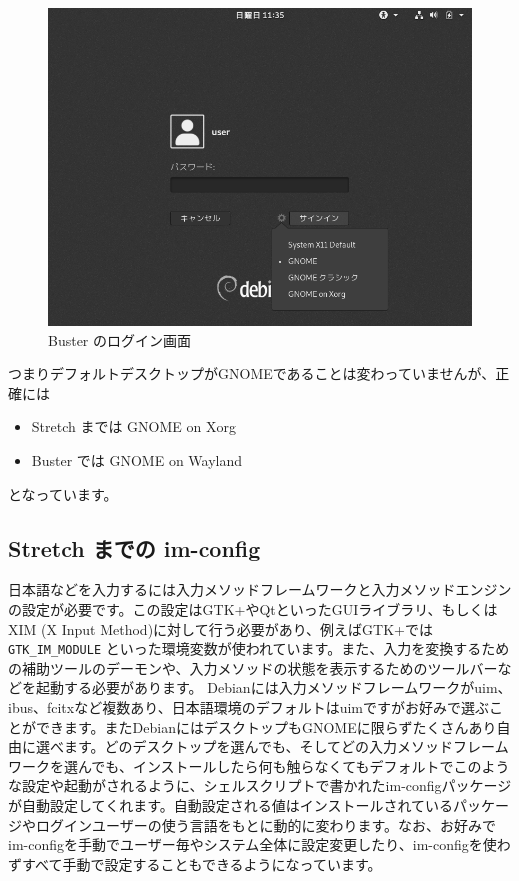 \documentclass[mingoth,a4paper]{jsarticle}
\begin{document}
\begin{figure}[h]
\begin{center}
\includegraphics[keepaspectratio,width=0.7\hsize]{image201907/buster_gnome_0_gray.png}
\end{center}
\caption{Buster のログイン画面}
\label{fig:gdm3-buster}
\end{figure}

つまりデフォルトデスクトップがGNOMEであることは変わっていませんが、正確には

\begin{itemize}
 \item Stretch までは GNOME on Xorg
 \item Buster では GNOME on Wayland
\end{itemize}

となっています。

\subsection{Stretch までの im-config}
日本語などを入力するには入力メソッドフレームワークと入力メソッドエンジンの設定が必要です。この設定はGTK+やQtといったGUIライブラリ、もしくはXIM (X Input Method)に対して行う必要があり、例えばGTK+では\verb|GTK_IM_MODULE| といった環境変数が使われています。また、入力を変換するための補助ツールのデーモンや、入力メソッドの状態を表示するためのツールバーなどを起動する必要があります。
Debianには入力メソッドフレームワークがuim、ibus、fcitxなど複数あり、日本語環境のデフォルトはuimですがお好みで選ぶことができます。またDebianにはデスクトップもGNOMEに限らずたくさんあり自由に選べます。どのデスクトップを選んでも、そしてどの入力メソッドフレームワークを選んでも、インストールしたら何も触らなくてもデフォルトでこのような設定や起動がされるように、シェルスクリプトで書かれたim-configパッケージが自動設定してくれます。自動設定される値はインストールされているパッケージやログインユーザーの使う言語をもとに動的に変わります。なお、お好みでim-configを手動でユーザー毎やシステム全体に設定変更したり、im-configを使わずすべて手動で設定することもできるようになっています。
\end{document}
